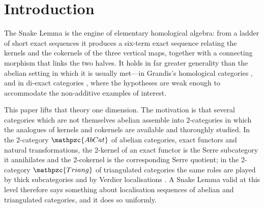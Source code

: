 \documentclass[reqno,a4paper]{amsart}
\numberwithin{equation}{section}
\theoremstyle{plain}
\theoremstyle{definition}
\newcommand{\catfont}[1]{\ensuremath{\mathpzc{#1}}\xspace}
\newcommand{\AbCat}{\catfont{AbCat}}
\newcommand{\Triang}{\catfont{Triang}}
\renewcommand{\1}{\onecat{1}}
\begin{document}
\maketitle

\section{Introduction}\label{S:Introduction}

The Snake Lemma is the engine of elementary homological algebra: from a ladder of short exact sequences it produces a six-term exact sequence relating the kernels and the cokernels of the three vertical maps, together with a connecting morphism that links the two halves. It holds in far greater generality than the abelian setting in which it is usually met---in Grandis's homological categories \cite{Grandis-HA1,Grandis-HA2}, and in di-exact categories \cite{Afsa-24,PVdL3}, where the hypotheses are weak enough to accommodate the non-additive examples of interest.

This paper lifts that theory one dimension. The motivation is that several categories which are not themselves abelian assemble into 2-categories in which the analogues of kernels and cokernels are available and thoroughly studied. In the 2-category \(\AbCat\) of abelian categories, exact functors and natural transformations, the 2-kernel of an exact functor is the Serre subcategory it annihilates and the 2-cokernel is the corresponding Serre quotient; in the 2-category \(\Triang\) of triangulated categories the same roles are played by thick subcategories and by Verdier localisations \cite{Verdier}. A Snake Lemma valid at this level therefore says something about localisation sequences of abelian and triangulated categories, and it does so uniformly.
\end{document}
